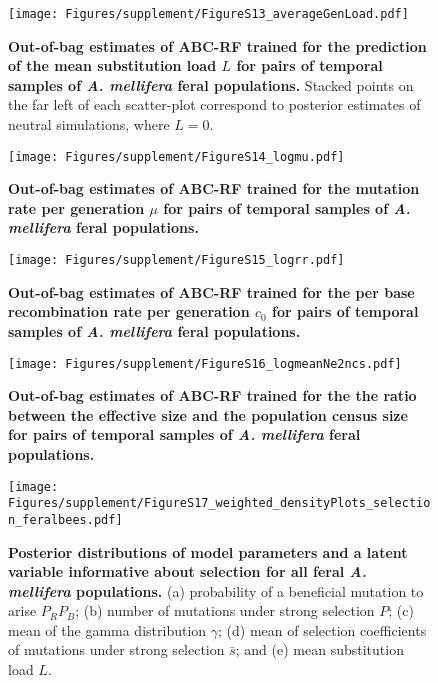 \documentclass[a4paper, 12pt]{article}
\begin{document}
\begin{figure}[ht]
  \centering
  \texttt{[image: Figures/supplement/FigureS13\_averageGenLoad.pdf]}
  \small\caption{\textbf{Out-of-bag estimates of ABC-RF trained for the prediction of the mean substitution load $L$ for pairs of temporal samples of \textit{A. mellifera} feral populations.} Stacked points on the far left of each scatter-plot correspond to posterior estimates of neutral simulations, where $L = 0$.}
  \label{fig:supple_feralbee_load}
\end{figure}

\begin{figure}[ht]
  \centering
  \texttt{[image: Figures/supplement/FigureS14\_logmu.pdf]}
  \small\caption{\textbf{Out-of-bag estimates of ABC-RF trained for the mutation rate per generation $\mu$ for pairs of temporal samples of \textit{A. mellifera} feral populations.}}
  \label{fig:supple_feralbee_mu}
\end{figure}

\begin{figure}[ht]
  \centering
  \texttt{[image: Figures/supplement/FigureS15\_logrr.pdf]}
  \small\caption{\textbf{Out-of-bag estimates of ABC-RF trained for the per base recombination rate per generation $c_{\mathrm{0}}$ for pairs of temporal samples of \textit{A. mellifera} feral populations.}}
  \label{fig:supple_feralbee_c0}
\end{figure}

\begin{figure}[ht]
  \centering
  \texttt{[image: Figures/supplement/FigureS16\_logmeanNe2ncs.pdf]}
  \small\caption{\textbf{Out-of-bag estimates of ABC-RF trained for the the ratio between the effective size and the population census size for pairs of temporal samples of \textit{A. mellifera} feral populations.}}
  \label{fig:supple_feralbee_nen}
\end{figure}


\begin{figure}[ht]
  \centering 
  \texttt{[image: Figures/supplement/FigureS17\_weighted\_densityPlots\_selection\_feralbees.pdf]}
  \small\caption{\textbf{Posterior distributions of model parameters and a latent variable informative about selection for all feral \textit{A. mellifera} populations.} (a) probability of a beneficial mutation to arise $P_RP_B$; (b) number of mutations under strong selection $P$; (c)  mean of the gamma distribution $\gamma$; (d) mean of selection coefficients of mutations under strong selection $\bar{s}$; and (e) mean substitution load $L$.}
  \label{fig:supple_feralbee_densityselection}
\end{figure}
\end{document}
